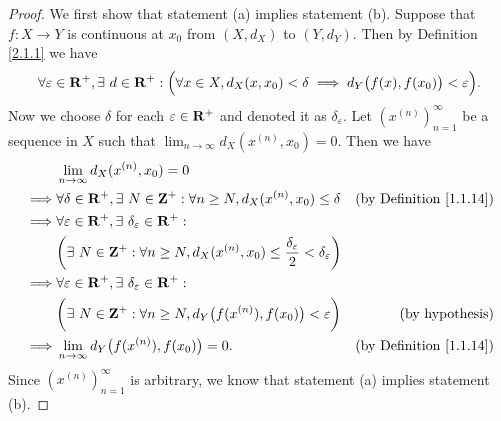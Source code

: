 \begin{proof}
    We first show that statement (a) implies statement (b).
    Suppose that \(f : X \to Y\) is continuous at \(x_0\) from \((X, d_X)\) to \((Y, d_Y)\).
    Then by Definition \ref{2.1.1} we have
    \[
        \forall \varepsilon \in \mathbf{R}^+, \exists\ d \in \mathbf{R}^+ : \Big(\forall x \in X, d_X(x, x_0) < \delta \implies d_Y\big(f(x), f(x_0)\big) < \varepsilon\Big).
    \]
    Now we choose \(\delta\) for each \(\varepsilon \in \mathbf{R}^+\) and denoted it as \(\delta_\varepsilon\).
    Let \((x^{(n)})_{n = 1}^\infty\) be a sequence in \(X\) such that \(\lim_{n \to \infty} d_X(x^{(n)}, x_0) = 0\).
    Then we have
    \begin{align*}
                 & \lim_{n \to \infty} d_X(x^{(n)}, x_0) = 0                                                                                                                          \\
        \implies & \forall \delta \in \R^+, \exists\ N \in \Z^+ : \forall n \geq N, d_X(x^{(n)}, x_0) \leq \delta                               & \text{(by Definition \ref{1.1.14})} \\
        \implies & \forall \varepsilon \in \R^+, \exists\ \delta_\varepsilon \in \R^+ :                                                                                               \\
                 & \bigg(\exists\ N \in \Z^+ : \forall n \geq N, d_X(x^{(n)}, x_0) \leq \frac{\delta_\varepsilon}{2} < \delta_\varepsilon\bigg)                                       \\
        \implies & \forall \varepsilon \in \R^+, \exists\ \delta_\varepsilon \in \R^+ :                                                                                               \\
                 & \bigg(\exists\ N \in \Z^+ : \forall n \geq N, d_Y\big(f(x^{(n)}), f(x_0)\big) < \varepsilon\bigg)                            & \text{(by hypothesis)}              \\
        \implies & \lim_{n \to \infty} d_Y\big(f(x^{(n)}), f(x_0)\big) = 0.                                                                     & \text{(by Definition \ref{1.1.14})}
    \end{align*}
    Since \((x^{(n)})_{n = 1}^\infty\) is arbitrary, we know that statement (a) implies statement (b).


\end{proof}

